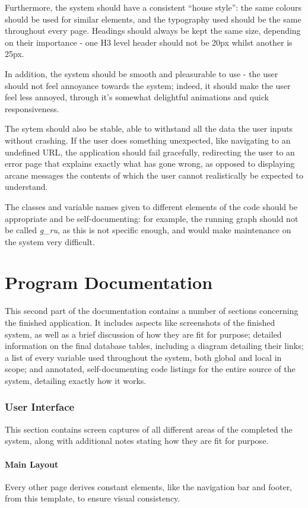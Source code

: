 \documentclass{article}[12pt,a4paper]
\begin{document}
Furthermore, the system should have a consistent ``house style'': the same colours should be used for similar elements, and the typography used should be the same throughout every page. Headings should always be kept the same size, depending on their importance - one H3 level header should not be 20px whilst another is 25px.

In addition, the system should be smooth and pleasurable to use - the user should not feel annoyance towards the system; indeed, it should make the user feel less annoyed, through it's somewhat delightful animations and quick responsiveness.

The sytem should also be stable, able to withstand all the data the user inputs without crashing. If the user does something unexpected, like navigating to an undefined URL, the application should fail gracefully, redirecting the user to an error page that explains exactly what has gone wrong, as opposed to displaying arcane messages the contents of which the user cannot realistically be expected to understand. 

The classes and variable names given to different elements of the code should be appropriate and be self-documenting: for example, the running graph should not be called \textit{g\_ru}, as this is not specific enough, and would make maintenance on the system very difficult.
\cleardoublepage


\part{Program Documentation}
This second part of the documentation contains a number of sections concerning the finished application. It includes aspects like screenshots of the finished system, as well as a brief discussion of how they are fit for purpose; detailed information on the final database tables, including a diagram detailing their links; a list of every variable used throughout the system, both global and local in scope; and annotated, self-documenting code listings for the entire source of the system, detailing exactly how it works.

\section{User Interface}
This section contains screen captures of all different areas of the completed the system, along with additional notes stating how they are fit for purpose.

\subsection{Main Layout}
Every other page derives constant elements, like the navigation bar and footer, from this template, to ensure visual consistency.
\end{document}
